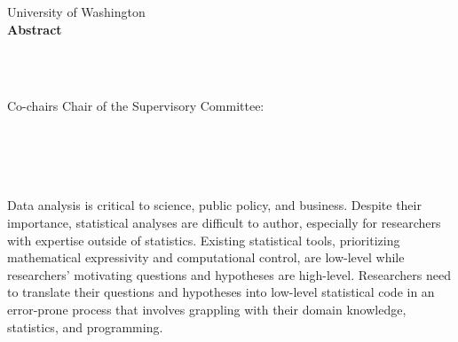 
\thispagestyle{empty}
\begin{centering}
\vspace{1in}
University of Washington \\
\vspace*{1.\baselineskip}
{\bf Abstract}\\
\vspace*{1\baselineskip}

{\thesisTitle}\\ %
\vspace*{1.\baselineskip}
{\authorName} \\ %
\vspace*{1.\baselineskip}


\ifdefined\secondAdvisor
    Co-chairs
    \else
    Chair
\fi
of the Supervisory Committee:\\ %
\advisorTitle~\advisor\\ \vspace{-.5em} \advisorDepartment \\
\ifdefined\secondAdvisor
    \secondAdvisorTitle~\secondAdvisor\\\vspace{-.5em}\secondAdvisorDepartment \\
\fi
\end{centering}
\vspace*{\baselineskip}

Data analysis is critical to science, public policy, and business. Despite their
importance, statistical analyses are difficult to author, especially for
researchers with expertise outside of statistics. Existing statistical tools,
prioritizing mathematical expressivity and computational control, are low-level
while researchers' motivating questions and hypotheses are high-level.
Researchers need to translate their questions and hypotheses into low-level
statistical code in an error-prone process that involves grappling with their
domain knowledge, statistics, and programming. 

